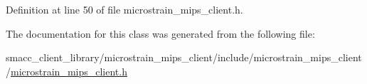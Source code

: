 Definition at line 50 of file microstrain\+\_\+mips\+\_\+client.\+h.



The documentation for this class was generated from the following file\+:\begin{DoxyCompactItemize}
\item 
smacc\+\_\+client\+\_\+library/microstrain\+\_\+mips\+\_\+client/include/microstrain\+\_\+mips\+\_\+client/\hyperlink{microstrain__mips__client_8h}{microstrain\+\_\+mips\+\_\+client.\+h}\end{DoxyCompactItemize}
